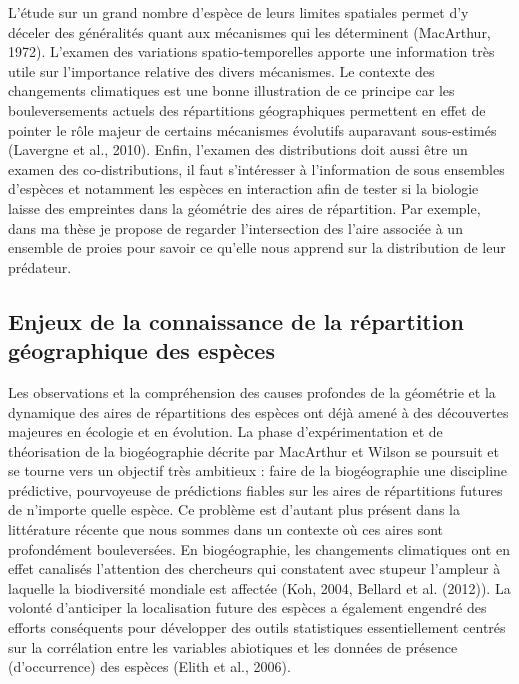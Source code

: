 L'étude sur un grand nombre d'espèce de leurs limites spatiales permet
d'y déceler des généralités quant aux mécanismes qui les déterminent
(MacArthur, 1972). L'examen des variations spatio-temporelles apporte
une information très utile sur l'importance relative des divers
mécanismes. Le contexte des changements climatiques est une bonne
illustration de ce principe car les bouleversements actuels des
répartitions géographiques permettent en effet de pointer le rôle majeur
de certains mécanismes évolutifs auparavant sous-estimés (Lavergne et
al., 2010). Enfin, l'examen des distributions doit aussi être un examen
des co-distributions, il faut s'intéresser à l'information de sous
ensembles d'espèces et notamment les espèces en interaction afin de
tester si la biologie laisse des empreintes dans la géométrie des aires
de répartition. Par exemple, dans ma thèse je propose de regarder
l'intersection des l'aire associée à un ensemble de proies pour savoir
ce qu'elle nous apprend sur la distribution de leur prédateur.

\subsection*{Enjeux de la connaissance de la répartition géographique
des
espèces}\label{enjeux-de-la-connaissance-de-la-ruxe9partition-guxe9ographique-des-espuxe8ces}

Les observations et la compréhension des causes profondes de la
géométrie et la dynamique des aires de répartitions des espèces ont déjà
amené à des découvertes majeures en écologie et en évolution. La phase
d'expérimentation et de théorisation de la biogéographie décrite par
MacArthur et Wilson se poursuit et se tourne vers un objectif très
ambitieux : faire de la biogéographie une discipline prédictive,
pourvoyeuse de prédictions fiables sur les aires de répartitions futures
de n'importe quelle espèce. Ce problème est d'autant plus présent dans
la littérature récente que nous sommes dans un contexte où ces aires
sont profondément bouleversées. En biogéographie, les changements
climatiques ont en effet canalisés l'attention des chercheurs qui
constatent avec stupeur l'ampleur à laquelle la biodiversité mondiale
est affectée (Koh, 2004, Bellard et al. (2012)). La volonté d'anticiper
la localisation future des espèces a également engendré des efforts
conséquents pour développer des outils statistiques essentiellement
centrés sur la corrélation entre les variables abiotiques et les données
de présence (d'occurrence) des espèces (Elith et al., 2006).

